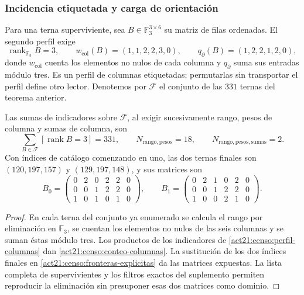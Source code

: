 \subsubsection{Incidencia etiquetada y carga de orientación}

Para una terna superviviente, sea \(B\in\mathbb F_3^{3\times6}\) su
matriz de filas ordenadas. El segundo perfil exige
\begin{equation}
 \operatorname{rank}_{\mathbb F_3}B=3,\qquad
 w_{\mathrm{col}}(B)=(1,1,2,2,3,0),\qquad
 q_{\partial}(B)=(1,2,2,1,2,0),
 \label{act21:censo:perfil-columnas}
\end{equation}
donde \(w_{\mathrm{col}}\) cuenta los elementos no nulos de cada
columna y \(q_{\partial}\) suma sus entradas módulo tres. Es un perfil
de columnas etiquetadas; permutarlas sin transportar el perfil define otro
lector. Denotemos por \(\mathcal F\) el conjunto de las \(331\) ternas
del teorema anterior.

\begin{proposition}
\label{act21:censo:dos-matrices}
Las sumas de indicadores sobre \(\mathcal F\), al exigir sucesivamente
rango, pesos de columna y sumas de columna, son
\begin{equation}
 \sum_{B\in\mathcal F}[\operatorname{rank}B=3]=331,
 \qquad N_{\mathrm{rango,pesos}}=18,
 \qquad N_{\mathrm{rango,pesos,sumas}}=2.
 \label{act21:censo:conteo-columnas}
\end{equation}
Con índices de catálogo comenzando en uno, las dos ternas finales son
\((120,197,157)\) y \((129,197,148)\), y sus matrices son
\[
 B_0=\begin{pmatrix}0&2&0&2&2&0\\0&0&1&2&2&0\\1&0&1&0&1&0\end{pmatrix},
 \qquad
 B_1=\begin{pmatrix}0&2&1&0&2&0\\0&0&1&2&2&0\\1&0&0&2&1&0\end{pmatrix}.
\]
\end{proposition}
\begin{proof}
En cada terna del conjunto ya enumerado se calcula el rango por eliminación
en \(\mathbb F_3\), se cuentan los elementos no nulos de las seis
columnas y se suman éstas módulo tres. Los productos de los indicadores
de \eqref{act21:censo:perfil-columnas} dan \eqref{act21:censo:conteo-columnas}.
La sustitución de los dos índices finales en
\eqref{act21:censo:fronteras-explicitas} da las matrices expuestas. La lista
completa de supervivientes y los filtros exactos del suplemento permiten
reproducir la eliminación sin presuponer esas dos matrices como dominio.
\end{proof}

